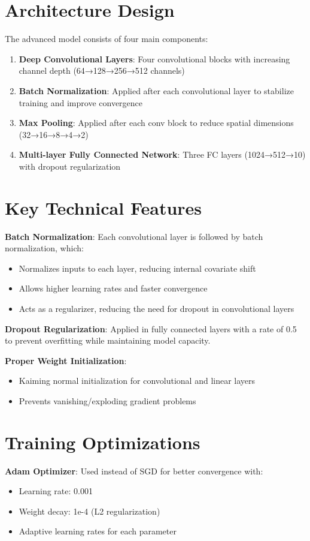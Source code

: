 \documentclass[11pt, a4paper, oneside]{memoir}
\begin{document}
\section*{Architecture Design}
The advanced model consists of four main components:

\begin{enumerate}
    \item \textbf{Deep Convolutional Layers}: Four convolutional blocks with increasing channel depth (64→128→256→512 channels)
    \item \textbf{Batch Normalization}: Applied after each convolutional layer to stabilize training and improve convergence
    \item \textbf{Max Pooling}: Applied after each conv block to reduce spatial dimensions (32→16→8→4→2)
    \item \textbf{Multi-layer Fully Connected Network}: Three FC layers (1024→512→10) with dropout regularization
\end{enumerate}

\section*{Key Technical Features}
\textbf{Batch Normalization}: Each convolutional layer is followed by batch normalization, which:
\begin{itemize}
    \item Normalizes inputs to each layer, reducing internal covariate shift
    \item Allows higher learning rates and faster convergence
    \item Acts as a regularizer, reducing the need for dropout in convolutional layers
\end{itemize}

\textbf{Dropout Regularization}: Applied in fully connected layers with a rate of 0.5 to prevent overfitting while maintaining model capacity.

\textbf{Proper Weight Initialization}: 
\begin{itemize}
    \item Kaiming normal initialization for convolutional and linear layers
    \item Prevents vanishing/exploding gradient problems
\end{itemize}

\section*{Training Optimizations}
\textbf{Adam Optimizer}: Used instead of SGD for better convergence with:
\begin{itemize}
    \item Learning rate: 0.001
    \item Weight decay: 1e-4 (L2 regularization)
    \item Adaptive learning rates for each parameter
\end{itemize}
\end{document}
